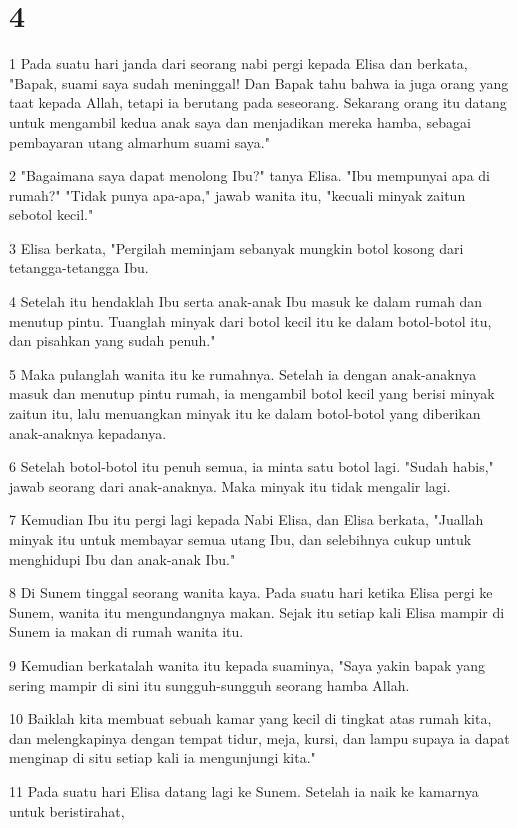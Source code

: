 \chapter{4}

\par 1 Pada suatu hari janda dari seorang nabi pergi kepada Elisa dan berkata, "Bapak, suami saya sudah meninggal! Dan Bapak tahu bahwa ia juga orang yang taat kepada Allah, tetapi ia berutang pada seseorang. Sekarang orang itu datang untuk mengambil kedua anak saya dan menjadikan mereka hamba, sebagai pembayaran utang almarhum suami saya."
\par 2 "Bagaimana saya dapat menolong Ibu?" tanya Elisa. "Ibu mempunyai apa di rumah?" "Tidak punya apa-apa," jawab wanita itu, "kecuali minyak zaitun sebotol kecil."
\par 3 Elisa berkata, "Pergilah meminjam sebanyak mungkin botol kosong dari tetangga-tetangga Ibu.
\par 4 Setelah itu hendaklah Ibu serta anak-anak Ibu masuk ke dalam rumah dan menutup pintu. Tuanglah minyak dari botol kecil itu ke dalam botol-botol itu, dan pisahkan yang sudah penuh."
\par 5 Maka pulanglah wanita itu ke rumahnya. Setelah ia dengan anak-anaknya masuk dan menutup pintu rumah, ia mengambil botol kecil yang berisi minyak zaitun itu, lalu menuangkan minyak itu ke dalam botol-botol yang diberikan anak-anaknya kepadanya.
\par 6 Setelah botol-botol itu penuh semua, ia minta satu botol lagi. "Sudah habis," jawab seorang dari anak-anaknya. Maka minyak itu tidak mengalir lagi.
\par 7 Kemudian Ibu itu pergi lagi kepada Nabi Elisa, dan Elisa berkata, "Juallah minyak itu untuk membayar semua utang Ibu, dan selebihnya cukup untuk menghidupi Ibu dan anak-anak Ibu."
\par 8 Di Sunem tinggal seorang wanita kaya. Pada suatu hari ketika Elisa pergi ke Sunem, wanita itu mengundangnya makan. Sejak itu setiap kali Elisa mampir di Sunem ia makan di rumah wanita itu.
\par 9 Kemudian berkatalah wanita itu kepada suaminya, "Saya yakin bapak yang sering mampir di sini itu sungguh-sungguh seorang hamba Allah.
\par 10 Baiklah kita membuat sebuah kamar yang kecil di tingkat atas rumah kita, dan melengkapinya dengan tempat tidur, meja, kursi, dan lampu supaya ia dapat menginap di situ setiap kali ia mengunjungi kita."
\par 11 Pada suatu hari Elisa datang lagi ke Sunem. Setelah ia naik ke kamarnya untuk beristirahat,

